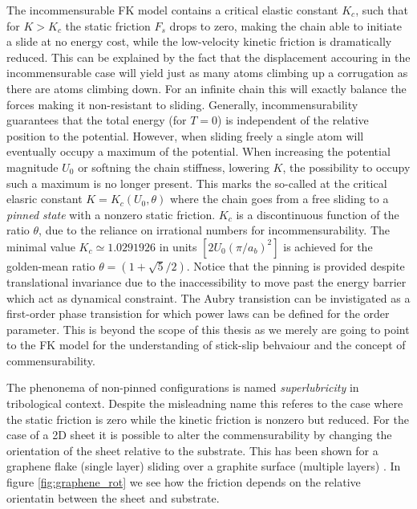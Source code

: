 
The incommensurable FK model contains a critical elastic constant $K_c$, such
that for $K > K_c$ the static friction $F_s$ drops to zero, making the chain able to initiate a slide at no energy cost, while the low-velocity kinetic friction is dramatically reduced. This can be explained by the
fact that the displacement accouring in the incommensurable case will yield just
as many atoms climbing up a corrugation as there are atoms climbing down. For an
infinite chain this will exactly balance the forces making it
non-resistant to sliding. Generally, incommensurability guarantees that the
total energy (for $T=0$) is independent of the relative position to the
potential. However, when sliding freely a single atom will eventually occupy a
maximum of the potential. When increasing the potential magnitude $U_0$ or
softning the chain stiffness, lowering $K$, the possibility to occupy such a
maximum is no longer present. This marks the so-called 
at the critical elasric constant $K = K_c(U_0, \theta)$ where the chain goes
from a free sliding to a \textit{pinned state} with a nonzero static friction.
$K_c$ is a discontinuous function of the ratio $\theta$, due to the reliance on
irrational numbers for incommensurability. The minimal
value $K_c \simeq 1.0291926 $ in units $[2 U_0 (\pi / a_b)^2]$ is achieved for
the golden-mean ratio $\theta = (1+\sqrt{5}/2)$. Notice that the pinning is
provided despite translational invariance due to the inaccessibility to move
past the energy barrier which act as dynamical constraint. The Aubry transistion
can be invistigated as a first-order phase transistion for which power laws can be
defined for the order parameter. This is beyond the scope of this thesis as we
merely are going to point to the FK model for the understanding of stick-slip
behvaiour and the concept of commensurability.

The phenonema of non-pinned configurations is named \textit{superlubricity} in
tribological context. Despite the misleadning name this referes to the case
where the static friction is zero while the kinetic friction is nonzero but
reduced. For the case of a 2D sheet it is possible to alter the commensurability
by changing the orientation of the sheet relative to the substrate. This has
been shown for a graphene flake (single layer) sliding over a graphite surface
(multiple layers) \cite{DIENWIEBEL2005197}. In figure \ref{fig:graphene_rot} we see how the friction depends on the relative orientatin between the sheet and substrate.


